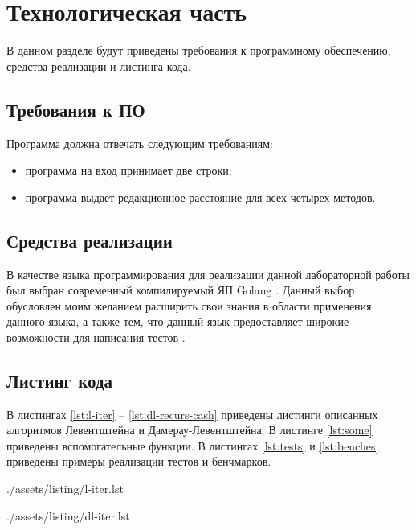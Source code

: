 \chapter{Технологическая часть}

В данном разделе будут приведены требования к программному обеспечению, средства реализации и листинга кода.

\section{Требования к ПО}

Программа должна отвечать следующим требованиям:
\begin{itemize}
	\item программа на вход принимает две строки;
	\item программа выдает редакционное расстояние для всех четырех методов. 
\end{itemize}

\section{Средства реализации}

В качестве языка программирования для реализации данной лабораторной работы был выбран современный компилируемый ЯП Golang \cite{golang}.
Данный выбор обусловлен моим желанием расширить свои знания в области применения данного языка, а также тем, что данный язык предоставляет широкие возможности для написания тестов \cite{gotest}.

\section{Листинг кода}

В листингах \ref{lst:l-iter} -- \ref{lst:dl-recurs-cash} приведены листинги описанных алгоритмов Левентштейна и Дамерау-Левентштейна.
В листинге \ref{lst:some} приведены вспомогательные функции.
В листингах \ref{lst:tests} и \ref{lst:benches} приведены примеры реализации тестов и бенчмарков.

\clearpage
\begin{lstinputlisting}[
	caption={Итеративный алгоритм Левентштейна},
	label={lst:l-iter},
	style={golang}
]{./assets/listing/l-iter.lst}
\end{lstinputlisting}

\clearpage
\begin{lstinputlisting}[
	caption={Итеративный алгоритм Дамерау-Левентштейна},
	label={lst:dl-iter},
	style={golang}
]{./assets/listing/dl-iter.lst}
\end{lstinputlisting}

